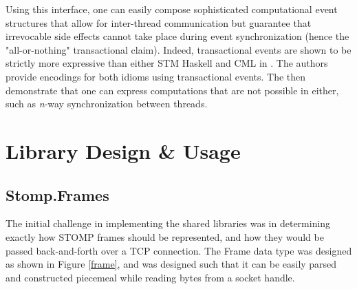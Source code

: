 \documentclass[conference, letterpaper]{IEEEtran}
\begin{document}
Using this interface, one can easily compose sophisticated computational event structures that allow for inter-thread communication but guarantee that irrevocable side effects cannot take place during event synchronization (hence the "all-or-nothing" transactional claim). Indeed, transactional events are shown to be strictly more expressive than either STM Haskell and CML in \cite{te:original}. The authors provide encodings for both idioms using transactional events. The then demonstrate that one can express computations that are not possible in either, such as \textit{n}-way synchronization between threads.

\section{Library Design \& Usage}

\subsection{Stomp.Frames}

The initial challenge in implementing the shared libraries was in determining exactly how STOMP frames should be represented, and how they would be passed back-and-forth over a TCP connection. The Frame data type was designed as shown in Figure \ref{frame}, and was designed such that it can be easily parsed and constructed piecemeal while reading bytes from a socket handle.
\end{document}
